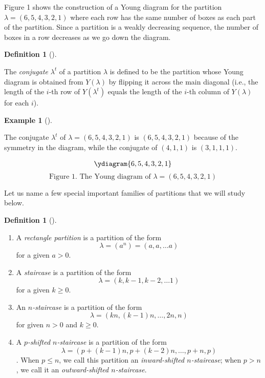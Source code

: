 \documentclass[numbers=enddot,12pt,final,onecolumn,notitlepage]{scrartcl}%
\theoremstyle{definition}
\newtheorem{defi}[theo]{Definition}
\newenvironment{definition}[1][]
{\begin{defi}[#1]\begin{leftbar}}
{\end{leftbar}\end{defi}}
\newtheorem{exam}[theo]{Example}
\newenvironment{example}[1][]
{\begin{exam}[#1]\begin{leftbar}}
{\end{leftbar}\end{exam}}
\newcommand{\tup}[1]{\left( #1 \right)}
\renewcommand{\leq}{\leqslant}
\renewcommand{\geq}{\geqslant}
\theoremstyle{plainsl}
\begin{document}
Figure 1 shows the construction of a Young diagram for the partition $\lambda = (6,5,4,3,2,1)$ where each row has the same number of boxes as each part of the partition. Since a partition is a weakly decreasing sequence, the number of boxes in a row decreases as we go down the diagram.

\begin{definition}
The \emph{conjugate} $\lambda^t$ of a partition $\lambda$ is defined to be the partition whose Young diagram is obtained from $Y\tup{\lambda}$ by flipping it across the main diagonal (i.e., the length of the $i$-th row of $Y\tup{\lambda^t}$ equals the length of the $i$-th column of $Y\tup{\lambda}$ for each $i$).
\end{definition} 

\begin{example}
The conjugate $\lambda^t$ of $\lambda = (6,5,4,3,2,1)$ is $(6,5,4,3,2,1)$ because of the symmetry in the diagram, while the conjugate of $(4,1,1)$ is $(3,1,1,1)$. 
\end{example}

\begin{align*}
\ydiagram{6,5,4,3,2,1} 
\end{align*}
\[
\text{Figure 1. The Young diagram of $\lambda = (6,5,4,3,2,1)$}
\]

Let us name a few special important families of partitions that we will study below.

\begin{definition}
\begin{enumerate}
    \item A \emph{rectangle partition} is a partition of the form 
\[\lambda = (a^n) = (a,a, \ldots a)\]
for a given $a > 0$.
    \item A \emph{staircase} is a partition of the form 
\[\lambda = (k, k-1, k-2, \ldots 1)\]
for a given $k \geq 0$.
    \item An \emph{$n$-staircase} is a partition of the form 
\[\lambda = (kn, (k-1)n, \ldots, 2n,  n)\]
for given $n > 0$ and $k \geq 0$.
    \item A \emph{$p$-shifted $n$-staircase} is a partition of the form
\[\lambda = (p+(k-1)n, p+(k-2)n, \ldots,p+n, p) \].
When $p \leq n$, we call this partition an \emph{inward-shifted $n$-staircase};
when $p > n$, we call it an \emph{outward-shifted $n$-staircase}.
\end{enumerate}

\end{definition}
\end{document}
